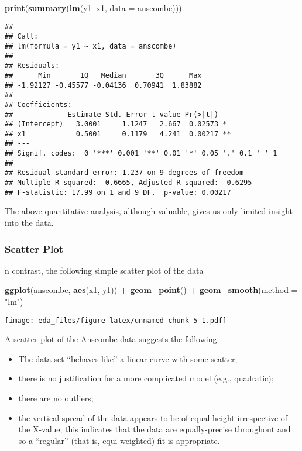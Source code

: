 \documentclass[]{book}
\newenvironment{Shaded}{\begin{snugshade}}{\end{snugshade}}
\newcommand{\KeywordTok}[1]{\textcolor[rgb]{0.13,0.29,0.53}{\textbf{#1}}}
\newcommand{\DataTypeTok}[1]{\textcolor[rgb]{0.13,0.29,0.53}{#1}}
\newcommand{\StringTok}[1]{\textcolor[rgb]{0.31,0.60,0.02}{#1}}
\newcommand{\OperatorTok}[1]{\textcolor[rgb]{0.81,0.36,0.00}{\textbf{#1}}}
\newcommand{\NormalTok}[1]{#1}
\providecommand{\tightlist}{%
  \setlength{\itemsep}{0pt}\setlength{\parskip}{0pt}}
\theoremstyle{definition}
\theoremstyle{definition}
\theoremstyle{definition}
\theoremstyle{remark}
\begin{document}
\begin{Shaded}
\begin{Highlighting}[]
\KeywordTok{print}\NormalTok{(}\KeywordTok{summary}\NormalTok{(}\KeywordTok{lm}\NormalTok{(y1}\OperatorTok{~}\NormalTok{x1, }\DataTypeTok{data =}\NormalTok{ anscombe)))}
\end{Highlighting}
\end{Shaded}

\begin{verbatim}
## 
## Call:
## lm(formula = y1 ~ x1, data = anscombe)
## 
## Residuals:
##      Min       1Q   Median       3Q      Max 
## -1.92127 -0.45577 -0.04136  0.70941  1.83882 
## 
## Coefficients:
##             Estimate Std. Error t value Pr(>|t|)   
## (Intercept)   3.0001     1.1247   2.667  0.02573 * 
## x1            0.5001     0.1179   4.241  0.00217 **
## ---
## Signif. codes:  0 '***' 0.001 '**' 0.01 '*' 0.05 '.' 0.1 ' ' 1
## 
## Residual standard error: 1.237 on 9 degrees of freedom
## Multiple R-squared:  0.6665, Adjusted R-squared:  0.6295 
## F-statistic: 17.99 on 1 and 9 DF,  p-value: 0.00217
\end{verbatim}

The above quantitative analysis, although valuable, gives us only
limited insight into the data.

\subsubsection{Scatter Plot}\label{scatter-plot}

n contrast, the following simple scatter plot of the data

\begin{Shaded}
\begin{Highlighting}[]
\KeywordTok{ggplot}\NormalTok{(anscombe, }\KeywordTok{aes}\NormalTok{(x1, y1)) }\OperatorTok{+}\StringTok{ }\KeywordTok{geom_point}\NormalTok{() }\OperatorTok{+}\StringTok{ }\KeywordTok{geom_smooth}\NormalTok{(}\DataTypeTok{method =} \StringTok{"lm"}\NormalTok{)}
\end{Highlighting}
\end{Shaded}

\texttt{[image: eda\_files/figure-latex/unnamed-chunk-5-1.pdf]}

A scatter plot of the Anscombe data suggests the following:

\begin{itemize}
\tightlist
\item
  The data set ``behaves like'' a linear curve with some scatter;
\item
  there is no justification for a more complicated model (e.g.,
  quadratic);
\item
  there are no outliers;
\item
  the vertical spread of the data appears to be of equal height
  irrespective of the X-value; this indicates that the data are
  equally-precise throughout and so a ``regular'' (that is,
  equi-weighted) fit is appropriate.
\end{itemize}
\end{document}
